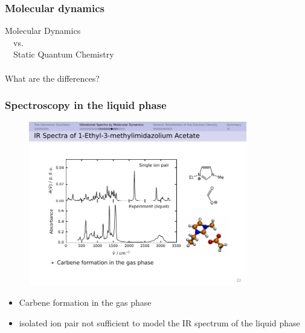 \documentclass[t]{beamer}
\begin{document}
\begin{frame}[plain,c]
	\frametitle{Molecular dynamics}
	\centering \Large
	Molecular Dynamics \\~\ vs. \\~\ Static Quantum Chemistry \\~\\
	What are the differences?
\end{frame}
\begin{frame}
	\frametitle{Spectroscopy in the liquid phase}
	\begin{figure}
		\includegraphics[width=0.85\textwidth]{figures/emimoac_ir.pdf}
	\end{figure}
	\pause
	\begin{itemize}
		\item Carbene formation in the gas phase
		\item isolated ion pair not sufficient to model the IR spectrum of the liquid phase
	\end{itemize}
\end{frame}
\end{document}
